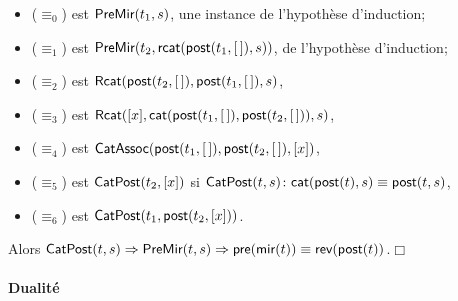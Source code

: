 \begin{itemize}

  \item (\(\equiv_0\)) est \(\textsf{PreMir}({t_1,s})\), une instance de
    l'hypothèse d'induction;

  \item (\(\equiv_1\)) est
  \(\textsf{PreMir}({t_2,\textsf{rcat}(\textsf{post}(t_1,[\,]),s)})\), de
  l'hypothèse d'induction;

  \item (\(\equiv_2\)) est
    \(\textsf{Rcat}({\textsf{post}(t_2,[\,]),\textsf{post}(t_1,[\,]),s})\),

  \item (\(\equiv_3\)) est
    \(\textsf{Rcat}({[x],\textsf{cat}(\textsf{post}(t_1,[\,]),
      \textsf{post}(t_2,[\,])),s})\),

  \item (\(\equiv_4\)) est \(\textsf{CatAssoc}({\textsf{post}(t_1,[\,]),
    \textsf{post}(t_2,[\,]),[x]})\),

  \item (\(\equiv_5\)) est
  \(\textsf{CatPost}({t_2,[x]})\) si
  \(\textsf{CatPost}({t,s}) \colon \textsf{cat}(\textsf{post}(t),s) \equiv
  \textsf{post}(t,s)\)\!,

  \item (\(\equiv_6\)) est \(\textsf{CatPost}({t_1,\textsf{post}(t_2,[x])})\).

\end{itemize}
Alors  \(\textsf{CatPost}({t,s}) \Rightarrow
\textsf{PreMir}({t,s}) \Rightarrow \textsf{pre}(\textsf{mir}(t)) \equiv
\textsf{rev}(\textsf{post}(t))\).\hfill\(\Box\)

\paragraph{Dualité}
\label{thm_duality}

